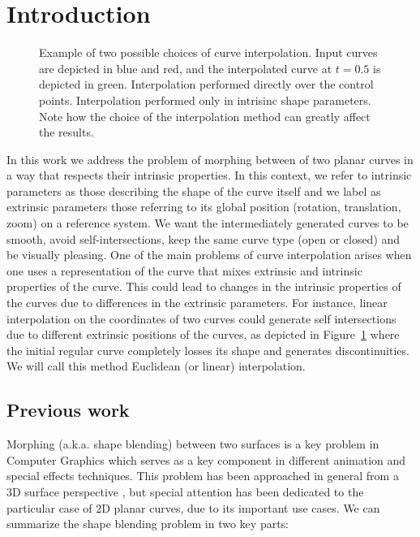 \documentclass{ipol}
\newcommand{\chapFiveDir}{images/chapter_05a}
\begin{document}
\section{Introduction}
%
\begin{figure}[h]
	\centering
	\caption{Example of two possible choices of curve interpolation. Input curves are depicted in blue and red, and the interpolated curve at $t=0.5$ is depicted in green. \protect{} Interpolation performed directly over the control points. \protect{} Interpolation performed only in intrisinc shape parameters. Note how the choice of the interpolation method can greatly affect the results.}
	\label{fig:image_interpolation:curve_interpolation:example}
\end{figure}
%
In this work we address the problem of morphing between of two planar curves in a way that respects their intrinsic properties. In this context, we refer to intrinsic parameters as those describing the shape of the curve itself and we label as extrinsic parameters those referring to its global position (rotation, translation, zoom) on a reference system. We want the intermediately generated curves to be smooth, avoid self-intersections, keep the same curve type (open or closed) and be visually pleasing. 
%
One of the main problems of curve interpolation arises when one uses a representation of the curve that mixes extrinsic and intrinsic properties of the curve. This could lead to changes in the intrinsic properties of the curves due to differences in the extrinsic parameters. For instance, linear interpolation on the coordinates of two curves could generate self intersections due to different extrinsic positions of the curves, as depicted in \mbox{Figure \ref{fig:image_interpolation:curve_interpolation:example}} where the initial regular curve completely losses its shape and generates discontinuities. We will call this method Euclidean (or linear) interpolation.\\

\subsection{Previous work}
Morphing (a.k.a. shape blending) between two surfaces is a key problem in Computer Graphics which serves as a key component in different animation and special effects techniques.
This problem has been approached in general from a 3D surface perspective , but special attention has been dedicated to the particular case of 2D planar curves, due to its important use cases.
We can summarize the shape blending problem in two key parts: 
  
\end{document}
